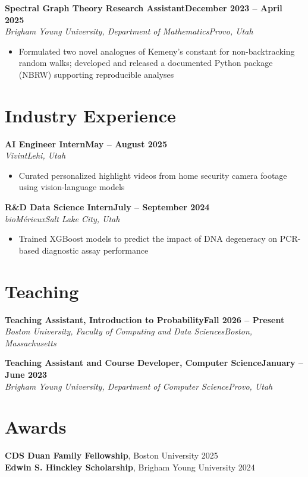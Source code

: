 \documentclass[10.5pt,letterpaper]{article}
\newcommand{\entry}[4]{%
  \textbf{#1}\hfill\textbf{#2}\\
  \textit{#3}\hfill\textit{#4}\par}
\begin{document}
\vspace{4pt}
\entry{Spectral Graph Theory Research Assistant}{December 2023 -- April 2025}
      {Brigham Young University, Department of Mathematics}{Provo, Utah}
\begin{itemize}
  \item Formulated two novel analogues of Kemeny's constant for non-backtracking random walks; developed and released a documented Python package (NBRW) supporting reproducible analyses
\end{itemize}

\section*{Industry Experience}
\entry{AI Engineer Intern}{May -- August 2025}
      {Vivint}{Lehi, Utah}
\begin{itemize}
  \item Curated personalized highlight videos from home security camera footage using vision-language models
\end{itemize}

\vspace{4pt}
\entry{R\&D Data Science Intern}{July -- September 2024}
      {bioM\'erieux}{Salt Lake City, Utah}
\begin{itemize}
  \item Trained XGBoost models to predict the impact of DNA degeneracy on PCR-based diagnostic assay performance
\end{itemize}

\section*{Teaching}
\entry{Teaching Assistant, Introduction to Probability}{Fall 2026 -- Present}
      {Boston University, Faculty of Computing and Data Sciences}{Boston, Massachusetts}

\vspace{4pt}
\entry{Teaching Assistant and Course Developer, Computer Science}{January -- June 2023}
      {Brigham Young University, Department of Computer Science}{Provo, Utah}

\section*{Awards}
\textbf{CDS Duan Family Fellowship}, Boston University \hfill 2025\\
\textbf{Edwin S. Hinckley Scholarship}, Brigham Young University \hfill 2024
\end{document}
